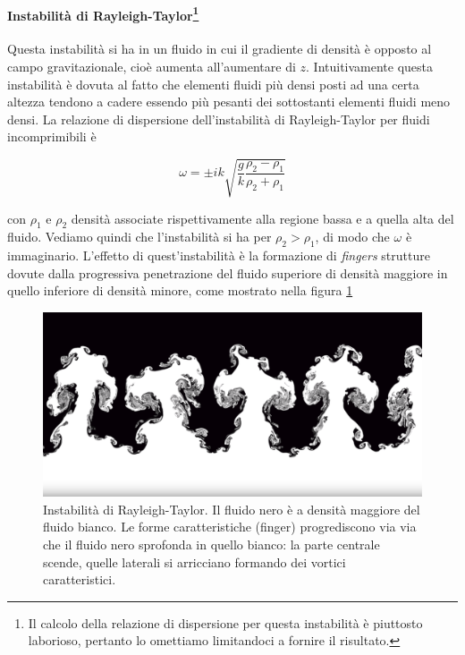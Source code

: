 \paragraph[Instabilità di Rayleigh-Taylor]{Instabilità di Rayleigh-Taylor\footnote{Il calcolo della relazione di dispersione per questa instabilità è piuttosto laborioso, pertanto lo omettiamo limitandoci a fornire il risultato.}}
Questa instabilità si ha in un fluido in cui il gradiente di densità è opposto al campo gravitazionale, cioè aumenta all'aumentare di $z$. Intuitivamente questa instabilità è dovuta al fatto che elementi fluidi più densi posti ad una certa altezza tendono a cadere essendo più pesanti dei sottostanti elementi fluidi meno densi. La relazione di dispersione dell'instabilità di Rayleigh-Taylor per fluidi incomprimibili è 
\begin{EQ}
\begin{equation}
\omega=\pm i k \sqrt{\dfrac{g}{k}\dfrac{\rho_2-\rho_1}{\rho_2+\rho_1}}
\end{equation}
\end{EQ}
con $\rho_1$ e $\rho_2$ densità associate rispettivamente alla regione bassa e a quella alta del fluido. Vediamo quindi che l'instabilità si ha per $\rho_2>\rho_1$, di modo che $\omega$ è immaginario.
L'effetto di quest'instabilità è la formazione di \textit{fingers} strutture dovute dalla progressiva penetrazione del fluido superiore di densità maggiore in quello inferiore di densità minore, come mostrato nella figura \ref{im:RayleighTaylor}
\begin{figure}
\includegraphics[width=\textwidth]{Rayleigh}
\caption{Instabilità di Rayleigh-Taylor. Il fluido nero è a densità maggiore del fluido bianco. Le forme caratteristiche (finger) progrediscono via via che il fluido nero sprofonda in quello bianco: la parte centrale scende, quelle laterali si arricciano formando dei vortici caratteristici. }
\label{im:RayleighTaylor}
\end{figure}

